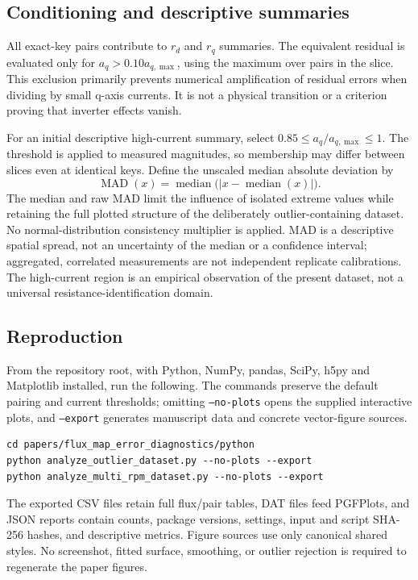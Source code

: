 \subsection{Conditioning and descriptive summaries}
All exact-key pairs contribute to $r_d$ and $r_q$ summaries. The equivalent
residual is evaluated only for $a_q>0.10a_{q,\max}$, using the maximum over
pairs in the slice. This exclusion primarily prevents numerical amplification
of residual errors when dividing by small q-axis currents. It is not a
physical transition or a criterion proving that inverter effects vanish.

For an initial descriptive high-current summary, select
$0.85\leq a_q/a_{q,\max}\leq1$. The threshold is applied to measured
magnitudes, so membership may differ between slices even at identical keys.
Define the unscaled median absolute deviation by
\begin{equation}
 \boxed{\operatorname{MAD}(x)=
 \operatorname{median}\bigl(|x-\operatorname{median}(x)|\bigr).}
 \label{eq:raw-mad}
\end{equation}
The median and raw MAD limit the influence of isolated extreme values while
retaining the full plotted structure of the deliberately outlier-containing
dataset. No normal-distribution consistency multiplier is applied. MAD is
a descriptive spatial spread, not an uncertainty of the median or a
confidence interval; aggregated, correlated measurements are not independent
replicate calibrations. The high-current region is an empirical observation
of the present dataset, not a universal resistance-identification domain.

\subsection{Reproduction}
From the repository root, with Python, NumPy, pandas, SciPy, h5py and
Matplotlib installed, run the following. The commands preserve the default
pairing and current thresholds; omitting \texttt{--no-plots} opens the supplied
interactive plots, and \texttt{--export} generates manuscript data and
concrete vector-figure sources.
\begin{verbatim}
cd papers/flux_map_error_diagnostics/python
python analyze_outlier_dataset.py --no-plots --export
python analyze_multi_rpm_dataset.py --no-plots --export
\end{verbatim}
The exported CSV files retain full flux/pair tables, DAT files feed PGFPlots,
and JSON reports contain counts, package versions, settings, input and script
SHA-256 hashes, and descriptive metrics. Figure sources use only canonical
shared styles. No screenshot, fitted surface, smoothing, or outlier rejection
is required to regenerate the paper figures.
